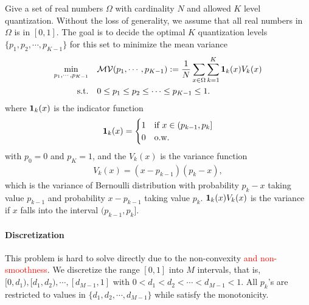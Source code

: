 Give a set of real numbers $\Omega$ with cardinality $N$ and allowed $K$ level quantization. Without the loss of generality, we assume that all real numbers in $\Omega$ is in $[0, 1]$. The goal is to decide the optimal $K$ quantization levels $\{p_1, p_2, \cdots, p_{K-1}\}$ for this set to minimize the mean variance
\begin{align}
\nonumber \min_{p_1, \cdots, p_{K-1}}\quad & \mathcal{MV}(p_1,\cdots, p_{K-1}) := {1\over N}\sum_{x\in \Omega} \sum_{k=1}^K {\bf 1}_k(x)V_k(x)\\
\text{s.t.}\quad & 0\leq p_1\leq p_2 \leq \cdots \leq p_{K-1} \leq 1.
\label{eq:opt_Q}
\end{align}
where ${\bf 1}_k(x)$ is the indicator function
\[
{\bf 1}_k(x) = 
\begin{cases}
1 & \text{if}~x\in (p_{k-1}, p_k] \\
0 & \text{o.w.}
\end{cases}
\]
with $p_0=0$ and $p_K=1$, and the $V_k(x)$ is the variance function 
\begin{align}
V_k(x) = (x-p_{k-1})(p_k - x), \label{eq:var}
\end{align}
which is the variance of Bernoulli distribution with probability $p_k-x$ taking value $p_{k-1}$ and probability $x-p_{k-1}$ taking value $p_k$. ${\bf 1}_k(x)V_k(x)$ is the variance if $x$ falls into the interval $(p_{k-1}, p_k]$. 

\paragraph*{Discretization}

This problem is hard to solve directly due to the non-convexity \textcolor{red}{and non-smoothness}. We discretize the range $[0,1]$ into $M$ intervals, that is, $[0,d_1), [d_1, d_2), \cdots, [d_{M-1}, 1]$ with $0< d_1<d_2<\cdots < d_{M-1}<1$. All $p_k$'s are restricted to values in $\{d_1, d_2, \cdots, d_{M-1}\}$ while satisfy the monotonicity. 

